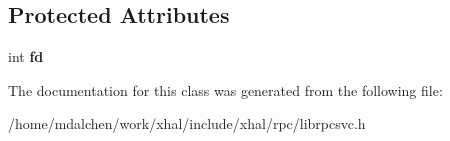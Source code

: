 \subsection*{Protected Attributes}
\begin{DoxyCompactItemize}
\item 
\hypertarget{classRPCSvc_af875b72d5b9455b4bc2c76b40440aed7}{
int {\bfseries fd}}
\label{classRPCSvc_af875b72d5b9455b4bc2c76b40440aed7}

\end{DoxyCompactItemize}


The documentation for this class was generated from the following file:\begin{DoxyCompactItemize}
\item 
/home/mdalchen/work/xhal/include/xhal/rpc/librpcsvc.h\end{DoxyCompactItemize}
